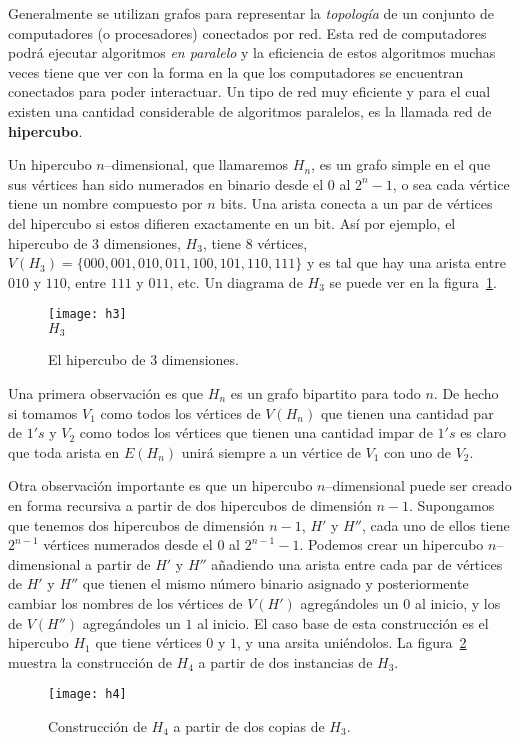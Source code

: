 \begin{ejemplo}[El Hipercubo.]
Generalmente se utilizan grafos para representar la \emph{topología} de un conjunto de computadores (o procesadores) conectados por red.
Esta red de computadores podrá ejecutar algoritmos \emph{en paralelo} y la eficiencia de estos algoritmos muchas veces tiene que ver con la forma en la que los computadores se encuentran conectados para poder interactuar.
Un tipo de red muy eficiente y para el cual existen una cantidad considerable de algoritmos paralelos, es la llamada red de {\bf hipercubo}.

Un hipercubo $n$--dimensional, que llamaremos $H_n$, es un grafo simple en el que sus vértices han sido numerados en binario desde el $0$ al $2^n-1$, o sea cada vértice tiene un nombre compuesto por $n$ bits.
Una arista conecta a un par de vértices del hipercubo si estos difieren exactamente en un bit.
Así por ejemplo, el hipercubo de 3 dimensiones, $H_3$, tiene $8$ vértices, $V(H_3)=\{000,001,010,011,100,101,110,111\}$ y es tal que hay una arista entre $010$ y $110$, entre $111$ y $011$, etc.
Un diagrama de $H_3$ se puede ver en la figura~\ref{fig:h3}.
\begin{figure}[h!]
\centering
\texttt{[image: h3]}\\
$H_3$
\caption{El hipercubo de 3 dimensiones.}
\label{fig:h3}
\end{figure}

Una primera observación es que $H_n$ es un grafo bipartito para todo $n$.
De hecho si tomamos $V_1$ como todos los vértices de $V(H_n)$ que tienen una cantidad par de $1's$ y $V_2$ como todos los vértices que tienen una cantidad impar de $1's$ es claro que toda arista en $E(H_n)$ unirá siempre a un vértice de $V_1$ con uno de $V_2$.

Otra observación importante es que un hipercubo $n$--dimensional puede ser creado en forma recursiva a partir de dos hipercubos de dimensión $n-1$.
Supongamos que tenemos dos hipercubos de dimensión $n-1$, $H'$ y $H''$, cada uno de ellos tiene $2^{n-1}$ vértices numerados desde el $0$ al $2^{n-1}-1$.
Podemos crear un hipercubo $n$--dimensional a partir de $H'$ y $H''$ añadiendo una arista entre cada par de vértices de $H'$ y $H''$ que tienen el mismo número binario asignado y posteriormente cambiar los nombres de los vértices de $V(H')$ agregándoles un $0$ al inicio, y los de $V(H'')$ agregándoles un $1$ al inicio.
El caso base de esta construcción es el hipercubo $H_1$ que tiene vértices $0$ y $1$, y una arsita uniéndolos.
La figura~\ref{fig:h4} muestra la construcción de $H_4$ a partir de dos instancias de $H_3$.
\begin{figure}[h!]
\centering
\texttt{[image: h4]}
\caption{Construcción de $H_4$ a partir de dos copias de $H_3$.}
\label{fig:h4}
\end{figure}


\end{ejemplo}
